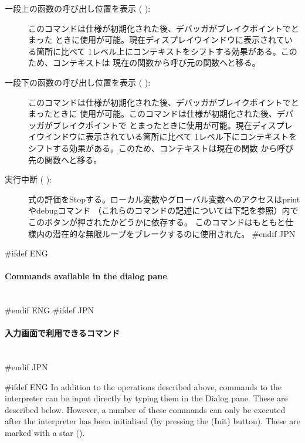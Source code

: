 \documentclass[\pformat,12pt]{article}
\newcommand{\subsubsubsection}[1]{\paragraph{#1}\mbox{}\\}
\newcommand{\guicmd}[1]{{\sf #1}}
\newcommand{\guicmd}[1]{{\gt #1}}
\begin{document}
\begin{description}
\item[\guicmd{一段上の函数の呼び出し位置を表示} (\hspace{-1.8mm}
):] 
このコマンドは仕様が初期化された後、デバッガがブレイクポイントでとまった
ときに使用が可能。現在ディスプレイウインドウに表示されている箇所に比べて
1レベル上にコンテキストをシフトする効果がある。このため、コンテキストは
現在の関数から呼び元の関数へと移る。

\item[\guicmd{一段下の函数の呼び出し位置を表示} (\hspace{-1.8mm}
):]
このコマンドは仕様が初期化された後、デバッガがブレイクポイントでとまったときに
使用が可能。このコマンドは仕様が初期化された後、デバッガがブレイクポイントで
とまったときに使用が可能。現在ディスプレイウインドウに表示されている箇所に比べて
1レベル下にコンテキストをシフトする効果がある。このため、コンテキストは現在の関数
から呼び先の関数へと移る。

\item[\guicmd{実行中断} (\hspace{-1.8mm}
):] 
  式の評価をStopする。ローカル変数やグローバル変数へのアクセスは\guicmd{print}や\guicmd{debug}コマンド
  （これらのコマンドの記述については下記を参照）内でこのボタンが押されたかどうかに依存する。
  このコマンドはもともと仕様内の潜在的な無限ループをブレークするのに使用された。
#endif JPN
\end{description}

#ifdef ENG
\subsubsubsection{Commands available in the dialog pane}
#endif ENG
#ifdef JPN
\subsubsubsection{入力画面で利用できるコマンド}
#endif JPN

#ifdef ENG
In addition to the operations described above, commands to the
interpreter can be input directly by typing them in the
\guicmd{Dialog} pane. These are described below. However, a number of
these commands can only be executed after the interpreter has
been initialised (by pressing the
(\guicmd{Init}) button).  These are
marked with a star ({\tt *}).
\end{document}
